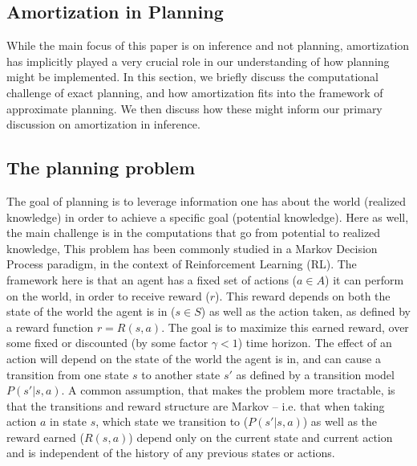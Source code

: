 

\subsection{Amortization in Planning}

While the main focus of this paper is on inference and not planning, amortization has implicitly played a very crucial role in our understanding of how planning might be implemented. In this section, we briefly discuss the computational challenge of exact planning, and how amortization fits into the framework of approximate planning. We then discuss how these might inform our primary discussion on amortization in inference.

\subsection*{The planning problem}

The goal of planning is to leverage information one has about the world (realized knowledge) in order to achieve a specific goal (potential knowledge). Here as well, the main challenge is in the computations that go from potential to realized knowledge, This problem has been commonly studied in a Markov Decision Process paradigm, in the context of Reinforcement Learning (RL). The framework here is that an agent has a fixed set of actions ($a \in A$) it can perform on the world, in order to receive reward ($r$). This reward depends on both the state of the world the agent is in ($s \in S$) as well as the action taken, as defined by a reward function $r = R(s, a)$. The goal is to maximize this earned reward, over some fixed or discounted (by some factor $\gamma < 1$) time horizon. The effect of an action will depend on the state of the world the agent is in, and can cause a transition from one state $s$ to another state $s'$ as defined by a transition model $P(s' | s, a)$. A common assumption, that makes the problem more tractable, is that the transitions and reward structure are Markov -- i.e. that when taking action $a$ in state $s$, which state we transition to ($P(s' | s, a)$) as well as the reward earned ($R(s,a)$) depend only on the current state and current action and is independent of the history of any previous states or actions.


